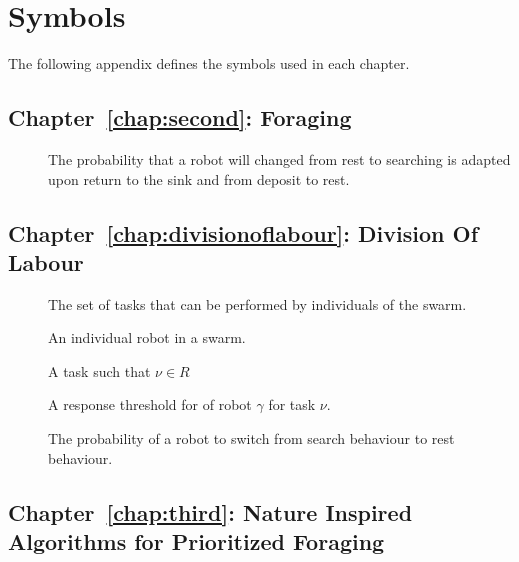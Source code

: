 
\chapter{Symbols}
\label{app:symbols}

The following appendix defines the symbols used in each chapter.  



\section{Chapter~\ref{chap:second}: Foraging}
\label{sec:symbols:foraging}


\begin{description}
	\item[\parbox{\namewidth}{$p1$}] The probability that a robot will changed from rest to searching is adapted upon return to the sink and from deposit to rest.
\end{description}

\section{Chapter~\ref{chap:divisionoflabour}: Division Of Labour}
\label{sec:symbols:divisionoflabour}


\begin{description}
	\item[\parbox{\namewidth}{$R$}] The set of tasks that can be performed by individuals of the swarm.
	\item[\parbox{\namewidth}{$\gamma$}] An individual robot in a swarm.
	\item[\parbox{\namewidth}{$\nu$}] A task such that $\nu \in R$
	\item[\parbox{\namewidth}{$r_{\gamma,\nu}$}] A response threshold for of robot $\gamma$ for task $\nu$.
	\item[\parbox{\namewidth}{$z$}] The probability of a robot to switch from search behaviour to rest behaviour.
\end{description}



\section{Chapter~\ref{chap:third}: Nature Inspired Algorithms for Prioritized Foraging}
\label{sec:symbols:foraging}

